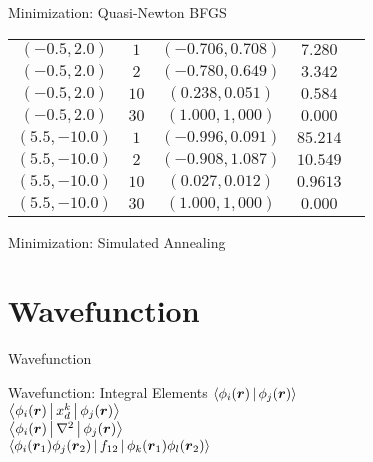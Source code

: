 \documentclass[10pt, t]{beamer}
\begin{document}
\begin{frame}[fragile]{Minimization: Quasi-Newton BFGS}
\begin{table}[H]
\begin{tabular}{ccccc}
            $(-0.5,2.0)$ & $1$ & $(-0.706,0.708)$ & $7.280$ \\
            $(-0.5,2.0)$ & $2$ & $(-0.780,0.649)$ & $3.342$ \\
            $(-0.5,2.0)$ & $10$ & $(0.238,0.051)$ & $0.584$ \\
            $(-0.5,2.0)$ & $30$ & $(1.000,1,000)$ & $0.000$ \\
            $(5.5,-10.0)$ & $1$ & $(-0.996,0.091)$ & $85.214$ \\
            $(5.5,-10.0)$ & $2$ & $(-0.908,1.087)$ & $10.549$ \\
            $(5.5,-10.0)$ & $10$ & $(0.027,0.012)$ & $0.9613$ \\
            $(5.5,-10.0)$ & $30$ & $(1.000,1,000)$ & $0.000$ \\ \hline\hline
        \end{tabular}
    \end{table}
\end{frame}

{
\begin{frame}[standout]{Minimization: Simulated Annealing}
\end{frame}}

\section{Wavefunction}

{
\begin{frame}[standout]{Wavefunction}
\end{frame}}

{
\begin{frame}[standout]{Wavefunction: Integral Elements}
    $\Braket{\phi_i(\boldsymbol{{r}})|\phi_j(\boldsymbol{{r}})}$ \\ \vsp\vsp\vsp\vsp
    $\Braket{\phi_i(\boldsymbol{{r}})|x^k_d|\phi_j(\boldsymbol{{r}})}$ \\ \vsp\vsp\vsp\vsp
    $\Braket{\phi_i(\boldsymbol{{r}})|\nabla^2|\phi_j(\boldsymbol{{r}})}$ \\ \vsp\vsp\vsp\vsp
    $\Braket{\phi_i(\boldsymbol{{r}}_1)\phi_j(\boldsymbol{{r}}_2)|f_{12}|\phi_k(\boldsymbol{{r}}_1)\phi_l(\boldsymbol{{r}}_2)}$ \\
\end{frame}}
\end{document}
